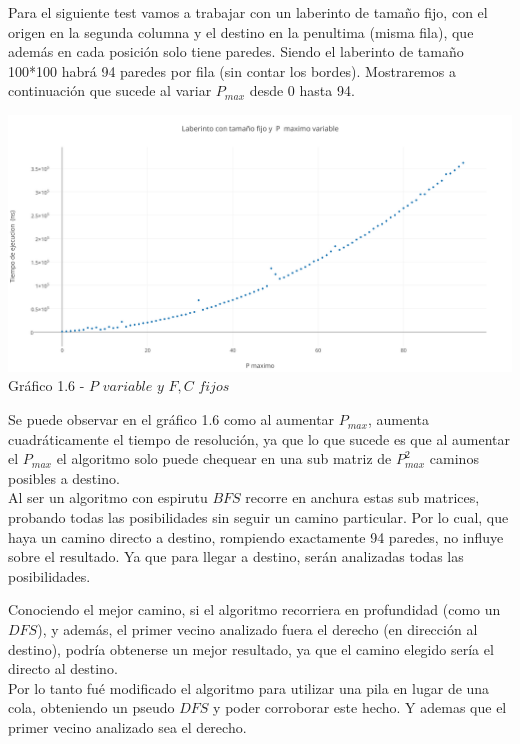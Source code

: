 Para el siguiente test vamos a trabajar con un laberinto de tamaño fijo, con el origen en la segunda columna y el destino en la penultima (misma fila), que además en cada posición solo tiene paredes. Siendo el laberinto de tamaño 100*100 habrá 94 paredes por fila (sin contar los bordes).
Mostraremos a continuaci\'on que sucede al variar $P_{max}$ desde 0 hasta 94.\\

\vspace*{0.3cm} \vspace*{0.3cm}
  \begin{center}
\includegraphics[scale=0.5]{./EJ1/pVariable.png}
{Gr\'afico 1.6 - $P$ $variable$ $y$ $F,C$ $fijos$}
  \end{center}
  \vspace*{0.3cm}

Se puede observar en el gr\'afico 1.6 como al aumentar $P_{max}$, aumenta cuadráticamente el tiempo de resoluci\'on, ya que lo que sucede es que al aumentar el $P_{max}$ el algoritmo solo puede chequear en una sub matriz de $P_{max}^2$ caminos posibles a destino.\\
Al ser un algoritmo con espirutu $BFS$ recorre en anchura estas sub matrices, probando todas las posibilidades sin seguir un camino particular.  Por lo cual, que haya un camino directo a destino, rompiendo exactamente 94 paredes, no influye sobre el resultado. Ya que para llegar a destino, serán analizadas todas las posibilidades. 

Conociendo el mejor camino, si el algoritmo recorriera en profundidad (como un $DFS$), y además, el primer vecino analizado fuera el derecho (en dirección al destino), podría obtenerse un mejor resultado, ya que el camino elegido sería el directo al destino.\\ 
Por lo tanto fué modificado el algoritmo para utilizar una pila en lugar de una cola, obteniendo un pseudo $DFS$ y poder corroborar este hecho. Y ademas que el primer vecino analizado sea el derecho.\\

